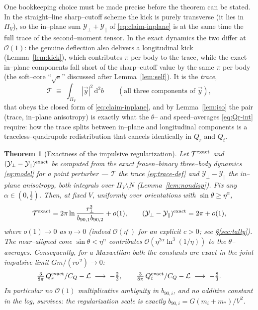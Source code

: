 \documentclass[11pt]{article}
\newcommand{\dd}{\mathrm{d}}
\newcommand{\rp}{r_\perp}
\newcommand{\Yp}{\mathcal Y_\perp}
\newcommand{\Ypa}{\mathcal Y_\parallel}
\newcommand{\order}[1]{\mathcal O\!\left(#1\right)}
\newtheorem{theorem}{Theorem}
\begin{document}
One bookkeeping choice must be made precise before the theorem can be stated. In the straight--line
sharp--cutoff scheme the kick is purely transverse (it lies in $\Pi_V$), so the in--plane sum
$\Yp+\Ypa$ of \eqref{eq:claim-inplane} is at the same time the full trace of the second--moment
tensor. In the exact dynamics the two differ at $\order1$: the genuine deflection also delivers a
longitudinal kick (Lemma~\ref{lem:kick}), which contributes $\pi$ per body to the trace, while the
exact in--plane components fall short of the sharp--cutoff value by the same $\pi$ per body (the
soft--core ``$\sqrt e$'' discussed after Lemma~\ref{lem:self}). It is the \emph{trace},
\begin{equation}
  \mathcal T\;\equiv\;\int_{\Pi_V}|\vec y|^2\,\dd^2b
  \qquad(\text{all three components of }\vec y),
  \label{eq:trace-def}
\end{equation}
that obeys the closed form of \eqref{eq:claim-inplane}, and by Lemma~\ref{lem:iso} the pair
(trace, in--plane anisotropy) is exactly what the $\theta$-- and speed--averages \eqref{eq:Qr-int}
require: how the trace splits between in--plane and longitudinal components is a
traceless--quadrupole redistribution that cancels identically in $Q_r$ and $Q_t$.

\begin{theorem}[Exactness of the impulsive regularization]
\label{thm:main}
Let $\mathcal T^{\rm exact}$ and $(\Yp-\Ypa)^{\rm exact}$ be computed from the exact frozen--binary
three--body dynamics \eqref{eq:model} for a point perturber --- $\mathcal T$ the trace
\eqref{eq:trace-def} and $\Yp-\Ypa$ the in--plane anisotropy, both integrals over
$\Pi_V\setminus N$ (Lemma~\ref{lem:nondisp}). Fix any $\alpha\in(0,\tfrac12)$. Then, at fixed $V$,
uniformly over orientations with $\sin\theta\ge\eta^{\alpha}$,
\begin{equation}
  \mathcal T^{\rm exact}=2\pi\ln\frac{\rp^2}{b_{90,1}b_{90,2}}+o(1),
  \qquad
  (\Yp-\Ypa)^{\rm exact}=2\pi+o(1),
  \label{eq:thm-inplane}
\end{equation}
where $o(1)\to0$ as $\eta\to0$ (indeed $\order{\eta^{c}}$ for an explicit $c>0$; see
\S\ref{sec:tally}). The near--aligned cone $\sin\theta<\eta^{\alpha}$ contributes
$\order{\eta^{2\alpha}\ln^3(1/\eta)}$ to the $\theta$--averages. Consequently, for a Maxwellian bath
the constants are exact in the joint impulsive limit $Gm/(r\sigma^2)\to0$:
\begin{equation}
  \tfrac{3}{8\pi}\,Q_r^{\rm exact}/C_Q-\mathcal L\;\longrightarrow\;-\tfrac23,\qquad
  \tfrac{3}{8\pi}\,Q_t^{\rm exact}/C_Q-\mathcal L\;\longrightarrow\;-\tfrac83 .
  \label{eq:thm-const}
\end{equation}
In particular no $\mathcal O(1)$ multiplicative ambiguity in $b_{90,i}$, and no additive constant in
the log, survives: the regularization scale is exactly $b_{90,i}=G(m_i+m_*)/V^2$.
\end{theorem}
\end{document}
